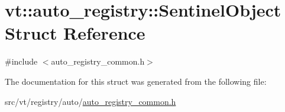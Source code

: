 \hypertarget{structvt_1_1auto__registry_1_1_sentinel_object}{}\section{vt\+:\+:auto\+\_\+registry\+:\+:Sentinel\+Object Struct Reference}
\label{structvt_1_1auto__registry_1_1_sentinel_object}


{\ttfamily \#include $<$auto\+\_\+registry\+\_\+common.\+h$>$}



The documentation for this struct was generated from the following file\+:\begin{DoxyCompactItemize}
\item 
src/vt/registry/auto/\hyperlink{auto__registry__common_8h}{auto\+\_\+registry\+\_\+common.\+h}\end{DoxyCompactItemize}
